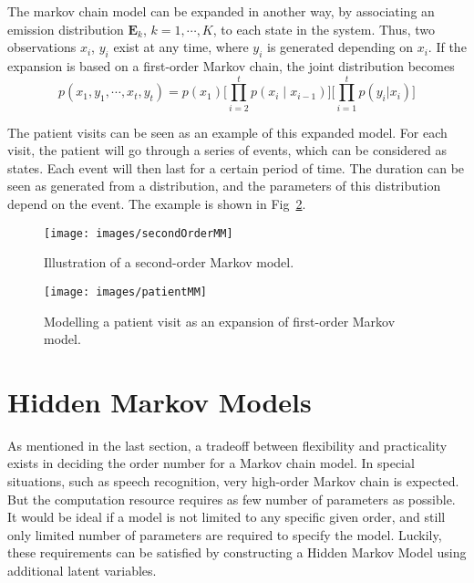 The markov chain model can be expanded in another way, by associating an emission distribution \(\mathbf{E}_k\), \(k = 1, \cdots , K\), to each state in the system. Thus, two observations \(x_i\), \(y_i\) exist at any time, where \(y_i\) is generated depending on \(x_i\). If the expansion is based on a first-order Markov chain, the joint distribution becomes
\begin{equation}
	p(x_1, y_1, \cdots, x_t, y_t) = p(x_1)\big[\prod_{i = 2}^{t} p(x_i \mid x_{i-1})\big]\big[\prod_{i=1}^{t}p(y_i|x_i)\big]
\end{equation}

The patient visits can be seen as an example of this expanded model. For each visit, the patient will go through a series of events, which can be considered as states. Each event will then last for a certain period of time. The duration can be seen as generated from a distribution, and the parameters of this distribution depend on the event. The example is shown in Fig~\ref{fig:patientMM}.

\begin{figure}[ht]
	\begin{center}
		\texttt{[image: images/secondOrderMM]}
		\caption{Illustration of a second-order Markov model.}
		\label{fig:secondOrderMM}
	\end{center}
\end{figure}

\begin{figure}[ht]
	\begin{center}
		\texttt{[image: images/patientMM]}
		\caption{Modelling a patient visit as an expansion of first-order Markov model.}
		\label{fig:patientMM}
	\end{center}
\end{figure}


\section{Hidden Markov Models}
\label{sec:HMM}
As mentioned in the last section, a tradeoff between flexibility and practicality exists in deciding the order number for a Markov chain model. In special situations, such as speech recognition, very high-order Markov chain is expected. But the computation resource requires as few number of parameters as possible. It would be ideal if a model is not limited to any specific given order, and still only limited number of parameters are required to specify the model. Luckily, these requirements can be satisfied by constructing a Hidden Markov Model using additional latent variables. 

